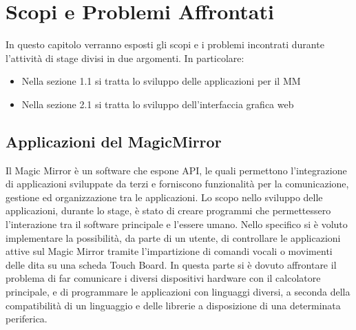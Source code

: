 \chapter{Scopi e Problemi Affrontati}\label{capitolo1}
In questo capitolo verranno esposti gli scopi e i problemi incontrati durante l'attività di stage divisi in due argomenti.
In particolare:
\begin{itemize}
\item Nella sezione 1.1 si tratta lo sviluppo delle applicazioni per il MM
\item Nella sezione 2.1 si tratta lo sviluppo dell'interfaccia grafica web
\end{itemize}
\section{Applicazioni del MagicMirror}
Il Magic Mirror \`e un software che espone API, le quali permettono
l'integrazione di applicazioni sviluppate da terzi e forniscono funzionalità per la comunicazione, gestione
ed organizzazione tra le applicazioni.
Lo scopo nello sviluppo delle applicazioni, durante lo stage, \`e stato
di creare programmi che permettessero l'interazione tra il software principale
e l'essere umano. Nello specifico si \`e voluto implementare la possibilit\`a, da parte di un utente,
di controllare le applicazioni attive sul Magic Mirror tramite l'impartizione di comandi vocali
o movimenti delle dita su una scheda Touch Board.
In questa parte si \`e dovuto affrontare il problema di far comunicare
i diversi dispositivi hardware con il calcolatore principale, e di programmare
le applicazioni con linguaggi diversi, a seconda della compatibilit\`a di un linguaggio
e delle librerie a disposizione di una determinata periferica.
\\[2\baselineskip]
